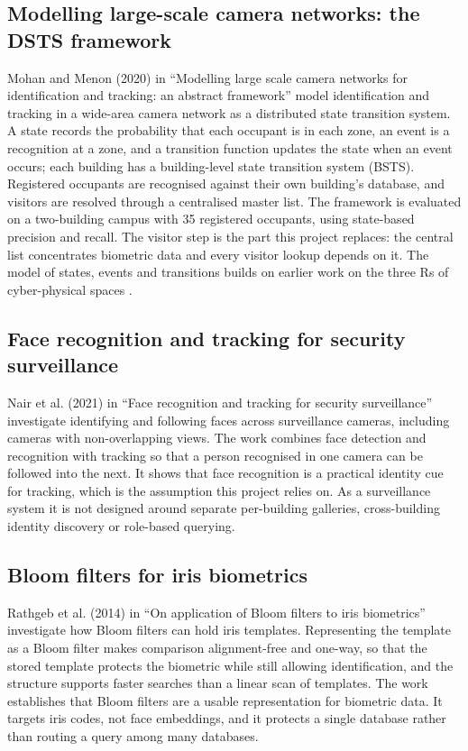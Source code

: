 \documentclass[12pt,a4paper,oneside]{report}
\begin{document}
\subsection{Modelling large-scale camera networks: the DSTS framework}
Mohan and Menon (2020) in ``Modelling large scale camera networks for identification and tracking: an abstract framework'' \cite{ref6} model identification and tracking in a wide-area camera network as a distributed state transition system. A state records the probability that each occupant is in each zone, an event is a recognition at a zone, and a transition function updates the state when an event occurs; each building has a building-level state transition system (BSTS). Registered occupants are recognised against their own building's database, and visitors are resolved through a centralised master list. The framework is evaluated on a two-building campus with 35 registered occupants, using state-based precision and recall. The visitor step is the part this project replaces: the central list concentrates biometric data and every visitor lookup depends on it. The model of states, events and transitions builds on earlier work on the three Rs of cyber-physical spaces \cite{ref7}.

\subsection{Face recognition and tracking for security surveillance}
Nair et al. (2021) in ``Face recognition and tracking for security surveillance'' \cite{ref8} investigate identifying and following faces across surveillance cameras, including cameras with non-overlapping views. The work combines face detection and recognition with tracking so that a person recognised in one camera can be followed into the next. It shows that face recognition is a practical identity cue for tracking, which is the assumption this project relies on. As a surveillance system it is not designed around separate per-building galleries, cross-building identity discovery or role-based querying.

\subsection{Bloom filters for iris biometrics}
Rathgeb et al. (2014) in ``On application of Bloom filters to iris biometrics'' \cite{ref10} investigate how Bloom filters can hold iris templates. Representing the template as a Bloom filter makes comparison alignment-free and one-way, so that the stored template protects the biometric while still allowing identification, and the structure supports faster searches than a linear scan of templates. The work establishes that Bloom filters are a usable representation for biometric data. It targets iris codes, not face embeddings, and it protects a single database rather than routing a query among many databases.
\end{document}
